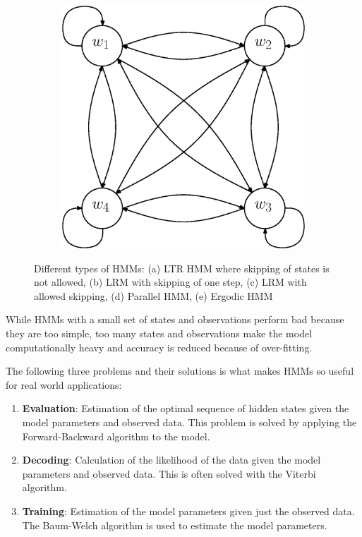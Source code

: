 \documentclass[a4paper, oneside]{csthesis}
\begin{document}
\begin{figure}
        \begin{subfigure}[b]{0.45\textwidth}
                \centering
                \includegraphics[width=\textwidth]{figures/hmm-ltr4.eps}
                \caption{}
                \label{fig:hmm1}
        \end{subfigure}%



        \caption{Different types of HMMs: (a) LTR HMM where skipping of states is not allowed, (b) LRM with skipping of one step, (c) LRM with allowed skipping, (d) Parallel HMM, (e) Ergodic HMM}\label{fig:markov-models}
\end{figure}



While HMMs with a small set of states and observations perform bad because they are too simple, too many states and observations make the model computationally heavy and accuracy is reduced because of over-fitting.

The following three problems and their solutions is what makes HMMs so useful for real world applications:
\begin{enumerate}
\item \textbf{Evaluation}: Estimation of the optimal sequence of hidden states given the model parameters and observed data. This problem is solved by applying the Forward-Backward algorithm to the model.
\item \textbf{Decoding}: Calculation of the likelihood of the data given the model parameters and observed data. This is often solved with the Viterbi algorithm.
\item \textbf{Training}: Estimation of the model parameters given just the observed data. The Baum-Welch algorithm is used to estimate the model parameters.
\end{enumerate}
\end{document}
